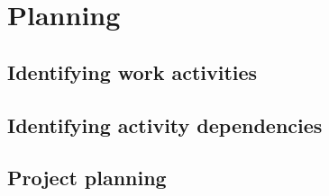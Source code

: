 \section{Planning}
\label{sec:EmpiriPlanning}
\subsection{Identifying work activities}

\subsection{Identifying activity dependencies}

\subsection{Project planning}
